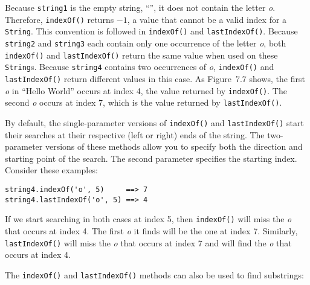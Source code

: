 \noindent Because {\tt string1} is the empty string, ``'', it does not
contain the letter {\it o}. Therefore, {\tt indexOf()} returns $-1$, a
value that cannot be a valid index for a {\tt String}. This convention
is followed in {\tt indexOf()} and {\tt lastIndexOf()}.  Because
{\tt string2} and {\tt string3} each contain only one occurrence of the
letter {\it o}, both {\tt indexOf()} and {\tt lastIndexOf()} return the
same value when used on these {\tt String}s.  Because {\tt string4}
contains two occurrences of {\it o}, {\tt indexOf()} and
{\tt lastIndexOf()} return different values in this case.
As Figure~7.7 shows, the first {\it o} in ``Hello World''
occurs at index 4, the value returned by {\tt indexOf()}. The second
{\it o} occurs at index 7, which is the value returned by
{\tt lastIndexOf()}.

By default, the single-parameter versions of {\tt indexOf()} and
{\tt last\-IndexOf()} start their searches at their respective (left or
right) ends of the string.   The two-parameter versions of these
methods allow you to specify both the direction and starting point of
the search.   The second parameter specifies the starting
index.  Consider these examples:

\begin{jjjlisting}
\begin{lstlisting}
string4.indexOf('o', 5)     ==> 7
string4.lastIndexOf('o', 5) ==> 4
\end{lstlisting}
\end{jjjlisting}

\noindent If we start searching in both cases at index 5, then
{\tt indexOf()} will miss the {\it o} that occurs at index 4. The first
{\it o} it finds will be the one at index 7. Similarly,
{\tt lastIndexOf()} will miss the {\it o} that occurs at index 7 and will find
the {\it o} that occurs at index 4.

The {\tt indexOf()} and {\tt lastIndexOf()} methods can also be used
to find substrings:


